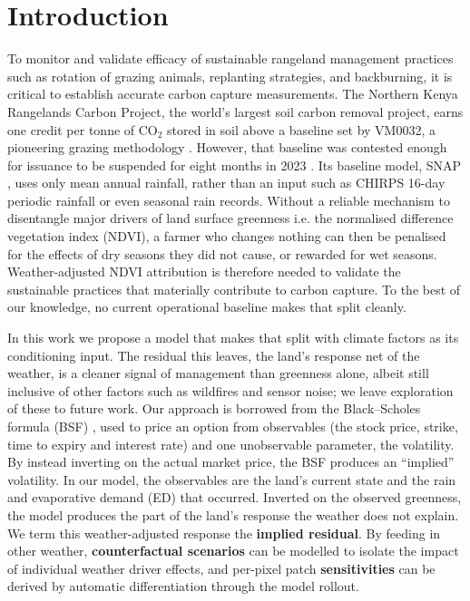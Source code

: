 \documentclass[letterpaper]{article} %
\begin{document}
\section{Introduction}
To monitor and validate efficacy of sustainable rangeland management practices such as rotation of grazing animals, replanting strategies, and backburning, it is critical to establish accurate carbon capture measurements. The Northern Kenya Rangelands Carbon Project, the world's largest soil carbon removal project, earns one credit per tonne of CO$_2$ stored in soil above a baseline set by VM0032, a pioneering grazing methodology \citep{vm0032,verra2023}. However, that baseline was contested enough for issuance to be suspended for eight months in 2023 \citep{verra2023}. Its baseline model, SNAP \citep{ritchie2014,nkgcp_pd2016}, uses only mean annual rainfall, rather than an input such as CHIRPS 16-day periodic rainfall \citep{chirps} or even seasonal rain records. Without a reliable mechanism to disentangle major drivers of land surface greenness i.e. the normalised difference vegetation index (NDVI),  a farmer who changes nothing can then be penalised for the effects of dry seasons they did not cause, or rewarded for wet seasons. Weather-adjusted NDVI attribution is therefore needed to validate the sustainable practices that materially contribute to carbon capture. To the best of our knowledge, no current operational baseline makes that split cleanly. 

In this work we propose a model that makes that split with climate factors as its conditioning input. The residual this leaves, the land's response net of the weather, is a cleaner signal of management than greenness alone, albeit still inclusive of other factors such as wildfires and sensor noise; we leave exploration of these to future work. Our approach is borrowed from the Black--Scholes formula (BSF) \citep{bs}, used to price an option from observables (the stock price, strike, time to expiry and interest rate) and one unobservable parameter, the volatility. By instead inverting on the actual market price, the BSF produces an ``implied'' volatility. In our model, the observables are the land's current state and the rain and evaporative demand (ED) that occurred. Inverted on the observed greenness, the model produces the part of the land's response the weather does not explain. We term this weather-adjusted response the \textbf{implied residual}. By feeding in other weather, \textbf{counterfactual scenarios} can be modelled to isolate the impact of individual weather driver effects, and per-pixel patch \textbf{sensitivities} can be derived by automatic differentiation through the model rollout.
\end{document}
